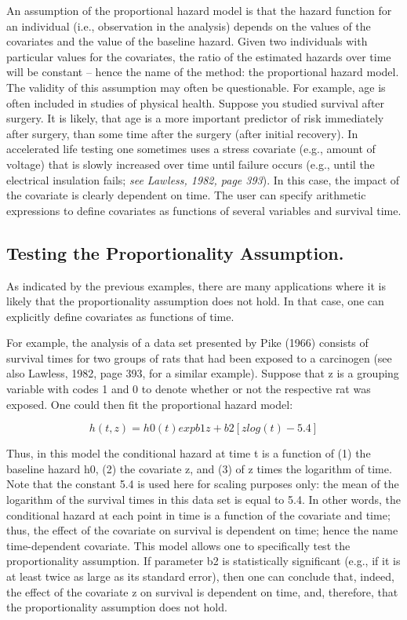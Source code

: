 \documentclass[11pt]{article} %
\begin{document}
An assumption of the proportional hazard model is that the hazard function for an individual (i.e., observation in the analysis) depends on the values of the covariates and the value of the baseline hazard. Given two individuals with particular values for the covariates, the ratio of the estimated hazards over time will be constant -- hence the name of the method: the proportional hazard model. The validity of this assumption may often be questionable. For example, age is often included in studies of physical health. Suppose you studied survival after surgery. It is likely, that age is a more important predictor of risk immediately after surgery, than some time after the surgery (after initial recovery). In accelerated life testing one sometimes uses a stress covariate (e.g., amount of voltage) that is slowly increased over time until failure occurs (e.g., until the electrical insulation fails; \textit{see Lawless, 1982, page 393}). In this case, the impact of the covariate is clearly dependent on time. The user can specify arithmetic expressions to define covariates as functions of several variables and survival time.

\subsection{Testing the Proportionality Assumption.} As indicated by the previous examples, there are many applications where it is likely that the proportionality assumption does not hold. In that case, one can explicitly define covariates as functions of time. 

For example, the analysis of a data set presented by Pike (1966) consists of survival times for two groups of rats that had been exposed to a carcinogen (see also Lawless, 1982, page 393, for a similar example). Suppose that z is a grouping variable with codes 1 and 0 to denote whether or not the respective rat was exposed. One could then fit the proportional hazard model:

\[h(t,z) = h0(t)exp{b1z + b2[zlog(t)-5.4]}\]

Thus, in this model the conditional hazard at time t is a function of (1) the baseline hazard h0, (2) the covariate z, and (3) of z times the logarithm of time. Note that the constant 5.4 is used here for scaling purposes only: the mean of the logarithm of the survival times in this data set is equal to 5.4. In other words, the conditional hazard at each point in time is a function of the covariate and time; thus, the effect of the covariate on survival is dependent on time; hence the name time-dependent covariate. This model allows one to specifically test the proportionality assumption. If parameter b2 is statistically significant (e.g., if it is at least twice as large as its standard error), then one can conclude that, indeed, the effect of the covariate z on survival is dependent on time, and, therefore, that the proportionality assumption does not hold.
\end{document}
